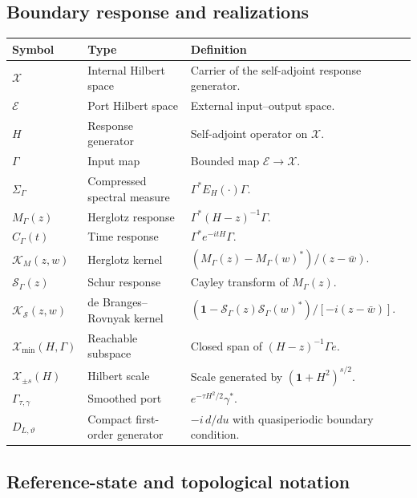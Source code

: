 \documentclass[11pt,reqno]{scrartcl}
\newcommand{\scrX}{\mathscr X}
\newcommand{\scrE}{\mathscr E}
\theoremstyle{plain}
\theoremstyle{definition}
\theoremstyle{remark}
\begin{document}
\subsection{Boundary response and realizations}

\begin{center}
\small
\begin{tabularx}{\textwidth}{>{\raggedright\arraybackslash}p{} >{\raggedright\arraybackslash}p{} X}
\toprule
\textbf{Symbol} & \textbf{Type} & \textbf{Definition} \\
\midrule
\(\scrX\) & Internal Hilbert space & Carrier of the self-adjoint response generator. \\
\(\scrE\) & Port Hilbert space & External input--output space. \\
\(H\) & Response generator & Self-adjoint operator on \(\scrX\). \\
\(\Gamma\) & Input map & Bounded map \(\scrE\to\scrX\). \\
\(\Sigma_\Gamma\) & Compressed spectral measure & \(\Gamma^*E_H(\cdot)\Gamma\). \\
\(M_\Gamma(z)\) & Herglotz response & \(\Gamma^*(H-z)^{-1}\Gamma\). \\
\(C_\Gamma(t)\) & Time response & \(\Gamma^*e^{-itH}\Gamma\). \\
\(\mathcal K_M(z,w)\) & Herglotz kernel & \((M_\Gamma(z)-M_\Gamma(w)^*)/(z-\bar w)\). \\
\(\mathscr S_\Gamma(z)\) & Schur response & Cayley transform of \(M_\Gamma(z)\). \\
\(\mathcal K_{\mathscr S}(z,w)\) & de Branges--Rovnyak kernel & \((\mathbf1-\mathscr S_\Gamma(z)\mathscr S_\Gamma(w)^*)/[-i(z-\bar w)]\). \\
\(\mathscr X_{\min}(H,\Gamma)\) & Reachable subspace & Closed span of \((H-z)^{-1}\Gamma e\). \\
\(\scrX_{\pm s}(H)\) & Hilbert scale & Scale generated by \((\mathbf1+H^2)^{s/2}\). \\
\(\Gamma_{\tau,\gamma}\) & Smoothed port & \(e^{-\tau H^2/2}\gamma^*\). \\
\(D_{L,\vartheta}\) & Compact first-order generator & \(-i\,d/du\) with quasiperiodic boundary condition. \\
\bottomrule
\end{tabularx}
\end{center}

\subsection{Reference-state and topological notation}
\end{document}
